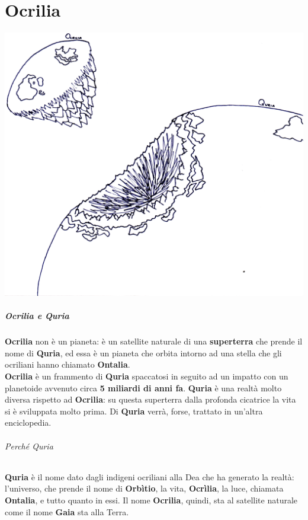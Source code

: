 \documentclass[10pt,twoside,onecolumn,openany]{book}
\begin{document}
\chapter{Ocrilia}
\begin{center}
\includegraphics[scale=0.8]{quriaocriliapianeti1}
\end{center}
\begin{multicols}{2}
\paragraph{Ocrilia e Quria} \textbf{Ocrilia} non è un pianeta: è un satellite naturale di una \textbf{superterra} che prende il nome di \textbf{Quria}, ed essa è un pianeta che orbita intorno ad una stella che gli ocriliani hanno chiamato \textbf{Ontalia}.\\
\textbf{Ocrilia} è un frammento di \textbf{Quria} spaccatosi in seguito ad un impatto con un planetoide avvenuto circa \textbf{5 miliardi di anni fa}. \textbf{Quria} è una realtà molto diversa rispetto ad \textbf{Ocrilia}: su questa superterra dalla profonda cicatrice la vita si è sviluppata molto prima. Di \textbf{Quria} verrà, forse, trattato in un'altra enciclopedia.
\columnbreak
\subparagraph{Perché Quria} \textbf{Quria} è il nome dato dagli indigeni ocriliani alla Dea che ha generato la realtà: l'universo, che prende il nome di \textbf{Orbìtio}, la vita, \textbf{Ocrìlia}, la luce, chiamata \textbf{Ontalia}, e tutto quanto in essi. Il nome \textbf{Ocrilia}, quindi, sta al satellite naturale come il nome \textbf{Gaia} sta alla Terra.
\end{multicols}
\end{document}
